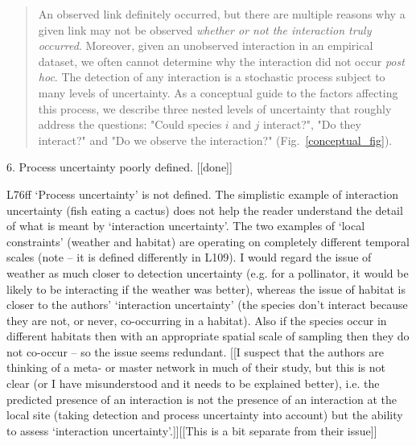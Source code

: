 \documentclass[12pt]{letter}
\newenvironment{refquote}{\bigskip \begin{it}}{\end{it}\smallskip}
\begin{document}
		\begin{quotation}
			An observed link definitely occurred, but there are multiple reasons why a given link may not be observed \emph{whether or not the interaction truly occurred}. Moreover, given an unobserved interaction in an empirical dataset, we often cannot determine why the interaction did not occur \emph{post hoc}. The detection of any interaction is a stochastic process subject to many levels of uncertainty. As a conceptual guide to the factors affecting this process, we describe three nested levels of uncertainty that roughly address the questions: "Could species $i$ and $j$ interact?", "Do they interact?" and "Do we observe the interaction?" (Fig.~\ref{conceptual_fig}). 
		\end{quotation}


	6. Process uncertainty poorly defined. [[done]]

		\begin{refquote}
		L76ff ‘Process uncertainty’ is not defined. The simplistic example of interaction uncertainty (fish eating a cactus) does not help the reader understand the detail of what is meant by ‘interaction uncertainty’. The two examples of ‘local constraints’ (weather and habitat) are operating on completely different temporal scales (note – it is defined differently in L109). I would regard the issue of weather as much closer to detection uncertainty (e.g. for a pollinator, it would be likely to be interacting if the weather was better), whereas the issue of habitat is closer to the authors’ ‘interaction uncertainty’ (the species don’t interact because they are not, or never, co-occurring in a habitat). Also if the species occur in different habitats then with an appropriate spatial scale of sampling then they do not co-occur – so the issue seems redundant. [[I suspect that the authors are thinking of a meta- or master network in much of their study, but this is not clear (or I have misunderstood and it needs to be explained better), i.e. the predicted presence of an interaction is not the presence of an interaction at the local site (taking detection and process uncertainty into account) but the ability to assess ‘interaction uncertainty’.]][[This is a bit separate from their issue]]
		\end{refquote}
\end{document}
